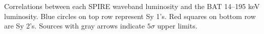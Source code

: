 \label{fig:lum_spire_BAT} Correlations between each SPIRE waveband luminosity and the BAT 14--195 keV luminosity. Blue circles on top row represent Sy 1's. Red squares on bottom row are Sy 2's. Sources with gray arrows indicate $5\sigma$ upper limits.